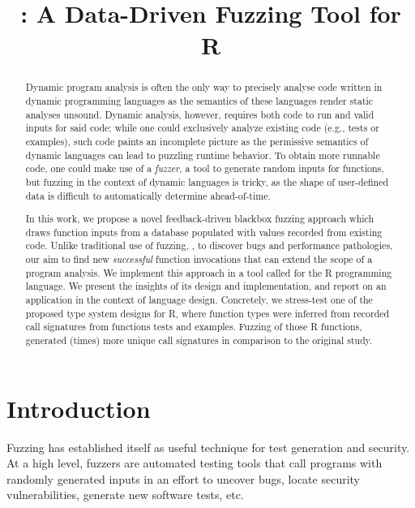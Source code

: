 \documentclass[sigplan,anonymous,review]{acmart}
\begin{document}
\title{\tool: A Data-Driven Fuzzing Tool for R}

\begin{abstract}

Dynamic program analysis is often the only way to precisely analyse code written in dynamic programming languages as the semantics of these languages render static analyses unsound. %
Dynamic analysis, however, requires both code to run and valid inputs for said code; while one could exclusively analyze existing code (e.g., tests or examples), such code paints an incomplete picture as the permissive semantics of dynamic languages can lead to puzzling runtime behavior.
To obtain more runnable code, one could make use of a \textit{fuzzer}, a tool to generate random inputs for functions, but fuzzing in the context of dynamic languages is tricky, as the shape of user-defined data is difficult to automatically determine ahead-of-time.

In this work, we propose a novel feedback-driven blackbox fuzzing approach which draws function inputs from a database populated with values recorded from existing code.
Unlike traditional use of fuzzing, \Ie, to discover bugs and performance pathologies, our aim to find new \textit{successful} function invocations that can extend the scope of a program analysis.
We implement this approach in a tool called \tool for the R programming language.
We present the insights of its design and implementation, and report on an application in the context of language design.
Concretely, we stress-test one of the proposed type system designs for R, where function types were inferred from recorded call signatures from functions tests and examples.
Fuzzing \UFNumFunctions of those R functions, \tool generated \UFSignatrAdditionalSignatures (\UFSignatrAdditionalSignaturesRatio times) more unique call signatures in comparison to the original study.

\end{abstract}

\maketitle

\section{Introduction}
\label{sec:introduction}

Fuzzing has established itself as useful technique for test generation and security.
At a high level, fuzzers are automated testing tools that call programs with randomly generated inputs in an effort to uncover bugs, locate security vulnerabilities, generate new software tests, etc.
\end{document}
